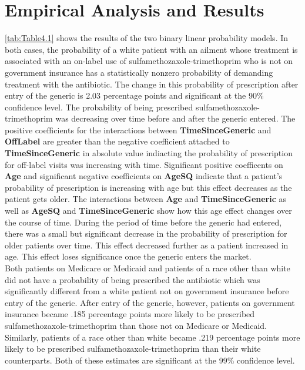 \chapter{Empirical Analysis and Results}
\indent \autoref{tab:Table4.1} shows the results of the two binary linear probability models. In both cases, the probability of a white patient with an ailment whose treatment is associated with an on-label use of sulfamethozaxole-trimethoprim who is not on government insurance has a statistically nonzero probability of demanding treatment with the antibiotic. The change in this probability of prescription after entry of the generic is 2.03 percentage points and significant at the 90\% confidence level. The probability of being prescribed sulfamethozaxole-trimethoprim was decreasing over time before and after the generic entered. The positive coefficients for the interactions between \textbf{TimeSinceGeneric} and \textbf{OffLabel} are greater than the negative coefficient attached to \textbf{TimeSinceGeneric} in absolute value indiacting the probability of prescription for off-label visits was increasing with time. Significant positive coefficents on \textbf{Age} and significant negative coefficients on \textbf{AgeSQ} indicate that a patient's probability of prescription is increasing with age but this effect decreases as the patient gets older. The interactions between \textbf{Age} and \textbf{TimeSinceGeneric} as well as \textbf{AgeSQ} and \textbf{TimeSinceGeneric} show how this age effect changes over the course of time. During the period of time before the generic had entered, there was a small but significant decrease in the probability of prescription for older patients over time. This effect decreased further as a patient increased in age. This effect loses significance once the generic enters the market.\\
\indent Both patients on Medicare or Medicaid and patients of a race other than white did not have a probability of being prescribed the antibiotic which was significantly different from a white patient not on government insurance before entry of the generic. After entry of the generic, however, patients on government insurance became .185 percentage points more likely to be prescribed sulfamethozaxole-trimethoprim than those not on Medicare or Medicaid. Similarly, patients of a race other than white became .219 percentage points more likely to be prescribed sulfamethozaxole-trimethoprim than their white counterparts. Both of these estimates are significant at the 99\% confidence level. 

\\
